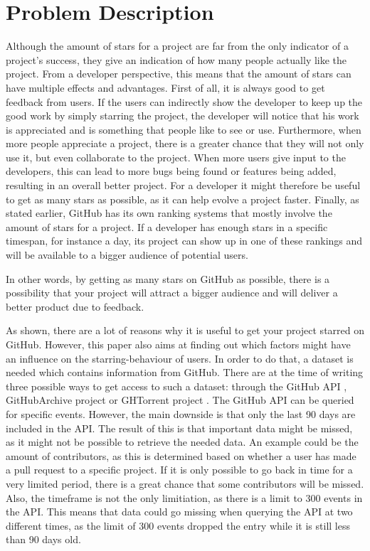 \section{Problem Description}
    Although the amount of stars for a project are far from the only indicator of a project's success, they give an indication of how many people actually like the project.
    From a developer perspective, this means that the amount of stars can have multiple effects and advantages.
    First of all, it is always good to get feedback from users.
    If the users can indirectly show the developer to keep up the good work by simply starring the project, the developer will notice that his work is appreciated and is something that people like to see or use.
    Furthermore, when more people appreciate a project, there is a greater chance that they will not only use it, but even collaborate to the project.
    When more users give input to the developers, this can lead to more bugs being found or features being added, resulting in an overall better project.
    For a developer it might therefore be useful to get as many stars as possible, as it can help evolve a project faster.
    Finally, as stated earlier, GitHub has its own ranking systems that mostly involve the amount of stars for a project.
    If a developer has enough stars in a specific timespan, for instance a day, its project can show up in one of these rankings and will be available to a bigger audience of potential users.

    In other words, by getting as many stars on GitHub as possible, there is a possibility that your project will attract a bigger audience and will deliver a better product due to feedback.



    As shown, there are a lot of reasons why it is useful to get your project starred on GitHub.
    However, this paper also aims at finding out which factors might have an influence on the starring-behaviour of users.
    In order to do that, a dataset is needed which contains information from GitHub.
    There are at the time of writing three possible ways to get access to such a dataset: through the GitHub API \cite{github-api-2016}, GitHubArchive project \cite{githubarchive-2016} or GHTorrent project \cite{ghtorrent-2016}.
    The GitHub API can be queried for specific events.
    However, the main downside is that only the last 90 days are included in the API.
    The result of this is that important data might be missed, as it might not be possible to retrieve the needed data.
    An example could be the amount of contributors, as this is determined based on whether a user has made a pull request to a specific project.
    If it is only possible to go back in time for a very limited period, there is a great chance that some contributors will be missed.
    Also, the timeframe is not the only limitiation, as there is a limit to 300 events in the API.
    This means that data could go missing when querying the API at two different times, as the limit of 300 events dropped the entry while it is still less than 90 days old.

